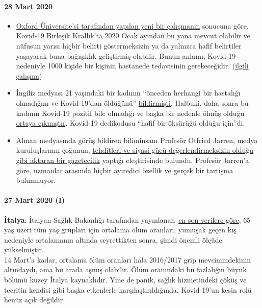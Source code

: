 \hypertarget{28-mart-2020}{%
\paragraph{28 Mart 2020}\label{28-mart-2020}}

\begin{itemize}
\tightlist
\item
  \href{https://news.yahoo.com/oxford-study-suggests-millions-people-221100162.html}{Oxford
  Üniversite'si tarafından yapılan yeni bir çalışmanın} sonucuna göre,
  Kovid-19 Birleşik Krallık'ta 2020 Ocak ayından bu yana mevcut olabilir
  ve nüfusun yarısı hiçbir belirti göstermeksizin ya da yalnızca hafif
  belirtiler yaşayarak buna bağışıklık geliştirmiş olabilir. Bunun
  anlamı, Kovid-19 nedeniyle 1000 kişide bir kişinin hastanede
  tedavisinin gerekeceğidir.
  (\href{https://www.medrxiv.org/content/10.1101/2020.03.24.20042291v1}{ilgili
  çalışma}) 
\item
  İngiliz medyası 21 yaşındaki bir kadının ``önceden herhangi bir
  hastalığı olmadığını ve Kovid-19'dan öldüğünü''
  \href{https://www.bbc.com/news/uk-england-beds-bucks-herts-52041709}{bildirmişti}.
  Halbuki, daha sonra bu kadının Kovid-19 pozitif bile olmadığı ve başka
  bir nedenle ölmüş olduğu
  \href{https://archive.is/20200329015127/https:/www.theguardian.com/world/2020/mar/27/chloe-middleton-death-21-year-old-not-recorded-nhs-covid-19-related}{ortaya
  çıkmıştır}. Kovid-19 dedikodusu ``hafif bir öksürüğü olduğu için''di.
\item
  Alman medyasında görüş bildiren biliminsanı Profesör Otfried Jarren,
  medya kuruluşlarının çoğunun,
  \href{https://www.deutschlandfunk.de/covid-19-scharfe-kritik-an-ard-und-zdf-wegen.2849.de.html?drn:news_id=1114517}{tehditleri
  ve siyasi gücü değerlendirmeksizin olduğu gibi aktaran bir
  gazetecilik} yaptığı eleştirisinde bulundu. Profesör Jarren'a göre,
  uzmanlar arasında hiçbir ayıredici özellik ve gerçek bir tartışma
  bulunmuyor.
\end{itemize}

\hypertarget{27-mart-2020-i}{%
\paragraph{27 Mart 2020 (I)}\label{27-mart-2020-i}}

\textbf{İtalya}: İtalyan Sağlık Bakanlığı tarafından
yayınlanan~\href{http://www.salute.gov.it/portale/caldo/SISMG_sintesi_ULTIMO.pdf}{en
son verilere göre}, 65 yaş üzeri tüm yaş grupları için ortalama ölüm
oranları, yumuşak geçen kış nedeniyle ortalamanın altında seyrettikten
sonra, şimdi önemli ölçüde yükselmiştir.\\
14 Mart'a kadar, ortalama ölüm oranları hala 2016/2017 grip
mevsimindekinin altındaydı, ama bu arada aşmış olabilir. Ölüm oranındaki
bu fazlalığın büyük bölümü kuzey İtalya kaynaklıdır. Yine de panik,
sağlık hizmetindeki çöküş ve tecritin kendisi gibi başka etkenlerle
karşılaştırıldığında, Kovid-19'un kesin rolü henüz açık değildir.\\


